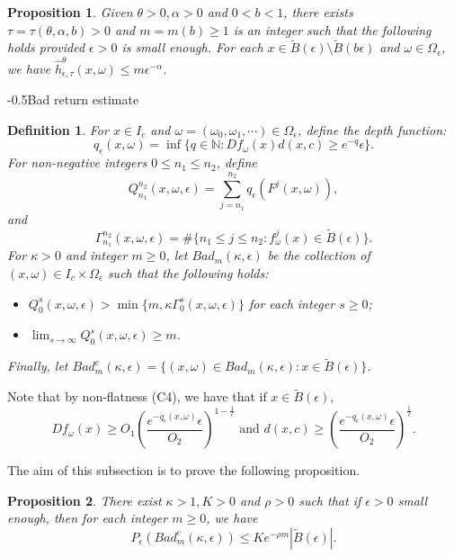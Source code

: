 \documentclass[11pt,oneside]{article}
\makeatletter
\newtheorem{definition}{Definition}[section]
\theoremstyle{plain}
\newtheorem{prop}{Proposition}
\numberwithin{equation}{section}
\numberwithin{figure}{section}
\numberwithin{table}{section}
\renewcommand{\subsection}{\@startsection{subsection}{1}{0mm}
{-\baselineskip}{0.5\baselineskip}{\large\bf\leftline}}
\makeatother
\begin{document}
\begin{prop}
Given $\theta >0, \alpha > 0$ and $0<b < 1$, there exists $\tau = \tau(\theta, \alpha, b) > 0$ and $m = m(b) \geq 1$ is an integer such that the following holds provided $\epsilon>0$ is small enough. For each $x \in \tilde B(\epsilon) \setminus \tilde B(b\epsilon) $ and $\omega  \in \Omega_{\epsilon}$, we have $\hat h^{\theta}_{\epsilon, \tau} (x, \omega)  \leq m \epsilon^{-\alpha}$.
\end{prop}


\subsection{Bad return estimate}


\begin{definition}
For $x \in I_c$ and $\omega = (\omega_0, \omega_1, \cdots) \in \Omega_{\epsilon}$, define the depth function:
\[
q_{\epsilon}(x, \omega) =  \inf \{q \in \mathbb N : Df_{\omega}(x) d(x, c) \geq e^{-q} \epsilon \}.
\]
For non-negative integers $0 \leq n_1 \leq n_2$, define
\[
Q_{n_1}^{n_2} (x, \omega, \epsilon) = \sum_{j=n_1}^{n_2} q_{\epsilon}(F^j(x, \omega)),
\]
and
\[
\Gamma_{n_1}^{n_2} (x, \omega, \epsilon) = \# \{ n_1 \leq j \leq n_2 : f_{\omega}^j(x) \in \tilde B(\epsilon) \}.
\]
For $\kappa > 0$ and integer $m \geq 0$, let $Bad_m(\kappa, \epsilon)$ be the collection of $(x, \omega) \in I_c \times \Omega_{\epsilon}$ such that the following holds:
\begin{itemize}
\item[(1)] $Q_0^s (x, \omega, \epsilon) > \min\{ m, \kappa \Gamma_0^s(x, \omega, \epsilon) \}$ for each integer $s \geq 0$;
\item[(2)] $\lim_{s \to \infty} Q_0^s (x, \omega, \epsilon) \geq m$.
\end{itemize}
Finally, let $Bad^c_m(\kappa, \epsilon) = \{ (x, \omega) \in Bad_m(\kappa, \epsilon) : x \in \tilde B(\epsilon) \}$.
\end{definition}


Note that by non-flatness (C4), we have that if $x \in \tilde B(\epsilon)$, 
\[
Df_{\omega} (x) \geq O_1 \left( \frac{e^{-q_{\epsilon}(x, \omega)}\epsilon}{O_2} \right)^{1 - \frac{1}{\ell}} \mbox{ and } d(x, c) \geq \left( \frac{e^{-q_{\epsilon}(x, \omega)}\epsilon}{O_2} \right)^{\frac{1}{\ell}}.
\]


The aim of this subsection is to prove the following proposition.


\begin{prop}
There exist $\kappa >1, K > 0$ and $\rho>0$ such that if $\epsilon > 0$ small enough, then for each integer $m \geq 0$, we have
\[
P_{\epsilon} (Bad^c_m(\kappa, \epsilon)) \leq K e^{- \rho m} |\tilde B(\epsilon)|.
\]
\end{prop}
\end{document}
